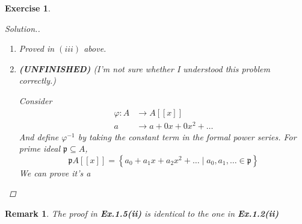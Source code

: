\documentclass{article}
\theoremstyle{breakstyle}
\newtheorem{exercise}{Exercise}
\newtheorem{remark}{Remark}
\newenvironment{solution}
  {\begin{proof}[Solution.]\renewcommand{\qedsymbol}{}}
  {\end{proof}}
\begin{document}
\begin{exercise}
\begin{solution}
\begin{enumerate}[label=({\roman*})]
\begin{enumerate}[label=({\alph*})]
                         Indeed, it's easy to see that the constant terms of all the elements in a arbitary ideal $\mathfrak{I}$ of $A[[x]]$ forms an ideal in $A$,
                         we denote then by $I$ and let $\mathfrak{I}_{I}=\mathfrak{I}$.
                         When $\mathfrak{I}_{I}$ is maximal, $I$ must be maximal in $A$, otherwise $\mathfrak{I}_{I}$ can expand to a larger ideal $\mathfrak{I}_{\overline{I}}$ where $\overline{I}$ is a maximal ideal containing $I$.

                         Hence the ideal of $A[[x]]$ is maximal if and only if the constant term ideal is maximal in $A$.
                         And $f$ is in a arbitary maximal ideal will indicate $a_0$ belongs to the correspond maximal ideal.
                         Deduction of Jacobson Radical follows immediately.
                \end{enumerate}
            \item Proved in $(iii)$ above.
            \item 
                \textbf{(UNFINISHED)}
                \emph{(I'm not sure whether I understood this problem correctly.)}

                Consider
                \begin{align*}
                    \varphi:A&\longrightarrow A[[x]]\\
                    a&\longrightarrow a+0x+0x^2+\ldots 
                \end{align*}
                And define $\varphi^{-1}$ by taking the constant term in the formal power series.
                For prime ideal $\mathfrak{p}\subseteq A$,
                $$
                \mathfrak{p}A[[x]]=\left\{ a_0+a_1x+a_2x^2+\ldots \mid a_0,a_1,\ldots \in \mathfrak{p} \right\} 
                $$
                We can prove it's a 
        \end{enumerate}
\end{solution}
\end{exercise}

\begin{remark}
    The proof in \textbf{Ex.1.5(ii)} is identical to the one in \textbf{Ex.1.2(ii)}
\end{remark}
\end{document}
